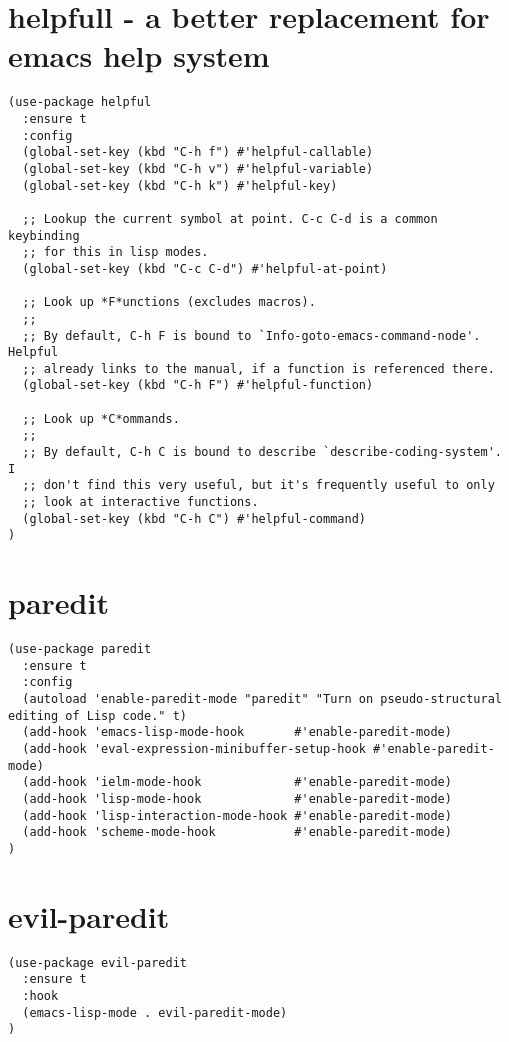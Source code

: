 \documentclass[11pt]{article}
\begin{document}
\section*{helpfull - a better replacement for emacs help system}
\label{sec:orga4a1798}

\begin{verbatim}
(use-package helpful
  :ensure t
  :config
  (global-set-key (kbd "C-h f") #'helpful-callable)
  (global-set-key (kbd "C-h v") #'helpful-variable)
  (global-set-key (kbd "C-h k") #'helpful-key)

  ;; Lookup the current symbol at point. C-c C-d is a common keybinding
  ;; for this in lisp modes.
  (global-set-key (kbd "C-c C-d") #'helpful-at-point)

  ;; Look up *F*unctions (excludes macros).
  ;;
  ;; By default, C-h F is bound to `Info-goto-emacs-command-node'. Helpful
  ;; already links to the manual, if a function is referenced there.
  (global-set-key (kbd "C-h F") #'helpful-function)

  ;; Look up *C*ommands.
  ;;
  ;; By default, C-h C is bound to describe `describe-coding-system'. I
  ;; don't find this very useful, but it's frequently useful to only
  ;; look at interactive functions.
  (global-set-key (kbd "C-h C") #'helpful-command)
)
\end{verbatim}
\section*{paredit}
\label{sec:org66194b2}

\begin{verbatim}
(use-package paredit
  :ensure t
  :config
  (autoload 'enable-paredit-mode "paredit" "Turn on pseudo-structural editing of Lisp code." t)
  (add-hook 'emacs-lisp-mode-hook       #'enable-paredit-mode)
  (add-hook 'eval-expression-minibuffer-setup-hook #'enable-paredit-mode)
  (add-hook 'ielm-mode-hook             #'enable-paredit-mode)
  (add-hook 'lisp-mode-hook             #'enable-paredit-mode)
  (add-hook 'lisp-interaction-mode-hook #'enable-paredit-mode)
  (add-hook 'scheme-mode-hook           #'enable-paredit-mode)
)
\end{verbatim}


\section*{evil-paredit}
\label{sec:orgba3a55b}

\begin{verbatim}
(use-package evil-paredit
  :ensure t
  :hook
  (emacs-lisp-mode . evil-paredit-mode)
)
\end{verbatim}
\end{document}
